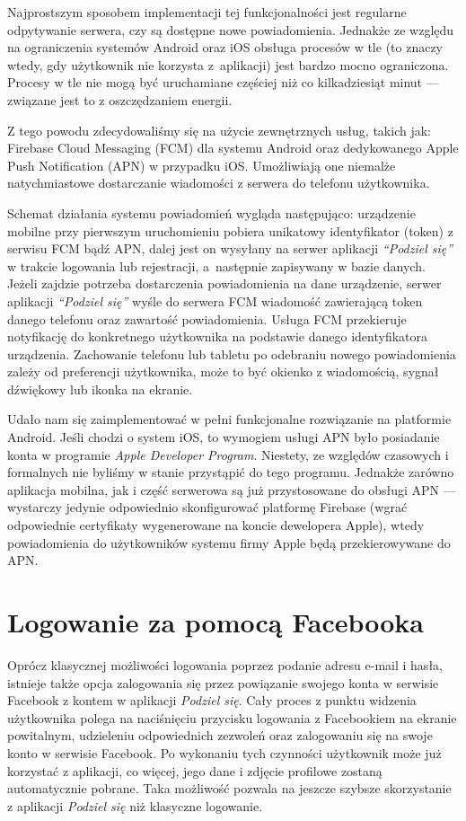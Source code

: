 \documentclass[licencjacka]{pracamgr}
\begin{document}
Najprostszym sposobem implementacji tej funkcjonalności jest regularne odpytywanie serwera, czy są dostępne nowe powiadomienia. Jednakże ze względu na ograniczenia systemów Android oraz iOS obsługa procesów w tle (to znaczy wtedy, gdy użytkownik nie korzysta z~aplikacji) jest bardzo mocno ograniczona. Procesy w tle nie mogą być uruchamiane częściej niż co kilkadziesiąt minut --- związane jest to z oszczędzaniem energii.

Z tego powodu zdecydowaliśmy się na użycie zewnętrznych usług, takich jak: Firebase Cloud Messaging (FCM) dla systemu Android oraz dedykowanego Apple Push Notification (APN) w przypadku iOS\@. Umożliwiają one niemalże natychmiastowe dostarczanie wiadomości z serwera do telefonu użytkownika.

Schemat działania systemu powiadomień wygląda następująco: urządzenie mobilne przy pierwszym uruchomieniu pobiera unikatowy identyfikator (token) z serwisu FCM bądź APN, dalej jest on wysyłany na serwer aplikacji \textit{``Podziel się''} w trakcie logowania lub rejestracji, a~następnie zapisywany w bazie danych. Jeżeli zajdzie potrzeba dostarczenia powiadomienia na dane urządzenie, serwer aplikacji \textit{``Podziel się''} wyśle do serwera FCM wiadomość zawierającą token danego telefonu oraz zawartość powiadomienia. Usługa FCM przekieruje notyfikację do konkretnego użytkownika na podstawie danego identyfikatora urządzenia. Zachowanie telefonu lub tabletu po odebraniu nowego powiadomienia zależy od preferencji użytkownika, może to być okienko z wiadomością, sygnał dźwiękowy lub ikonka na ekranie.

Udało nam się zaimplementować w pełni funkcjonalne rozwiązanie na platformie Android. Jeśli chodzi o system iOS, to wymogiem usługi APN było posiadanie konta w programie \textit{Apple Developer Program}. Niestety, ze względów czasowych i formalnych nie byliśmy w stanie przystąpić do tego programu. Jednakże zarówno aplikacja mobilna, jak i część serwerowa są już przystosowane do obsługi APN --- wystarczy jedynie odpowiednio skonfigurować platformę Firebase (wgrać odpowiednie certyfikaty wygenerowane na koncie dewelopera Apple), wtedy powiadomienia do użytkowników systemu firmy Apple będą przekierowywane do APN\@.

\section{Logowanie za pomocą Facebooka}

Oprócz klasycznej możliwości logowania poprzez podanie adresu e-mail i hasła, istnieje także opcja zalogowania się przez powiązanie swojego konta w serwisie Facebook z kontem w aplikacji \textit{Podziel się}. Cały proces z punktu widzenia użytkownika polega na naciśnięciu przycisku logowania z Facebookiem na ekranie powitalnym, udzieleniu odpowiednich zezwoleń oraz zalogowaniu się na swoje konto w serwisie Facebook. Po wykonaniu tych czynności użytkownik może już korzystać z aplikacji, co więcej, jego dane i zdjęcie profilowe zostaną automatycznie pobrane. Taka możliwość pozwala na jeszcze szybsze skorzystanie z aplikacji \textit{Podziel się} niż klasyczne logowanie.
\end{document}
